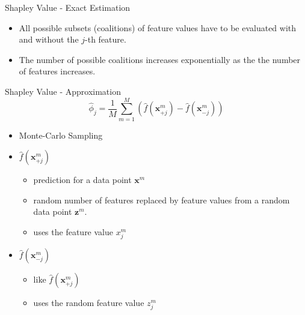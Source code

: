

\begin{frame}{Shapley Value - Exact Estimation}
	\begin{itemize}
		\item All possible subsets (coalitions) of feature values have to be evaluated with and without the $j$-th feature.
		\item The number of possible coalitions increases exponentially as the the number of features increases.
	\end{itemize}
\end{frame}
\begin{frame}{Shapley Value - Approximation\footnotemark}
\begin{equation}
	\hat{\phi}_{j}=\frac{1}{M}\sum_{m=1}^M\left(\hat{f}(\bm{x}^{m}_{+j})-\hat{f}(\bm{x}^{m}_{-j})\right)
\end{equation}
\begin{itemize}
	\item Monte-Carlo Sampling
	\item $\hat{f}(\bm{x}^{m}_{+j})$
	\begin{itemize}
		\item prediction for a data point $\bm{x}^m$
		\item random number of features replaced by feature values from a random data point $\bm{z}^m$.
		\item uses the feature value $x^m_j$
	\end{itemize}
	\item $\hat{f}(\bm{x}^{m}_{-j})$
	\begin{itemize}
		\item like $\hat{f}(\bm{x}^{m}_{+j})$
		\item uses the random feature value $z^m_j$
	\end{itemize}
\end{itemize}
\end{frame}